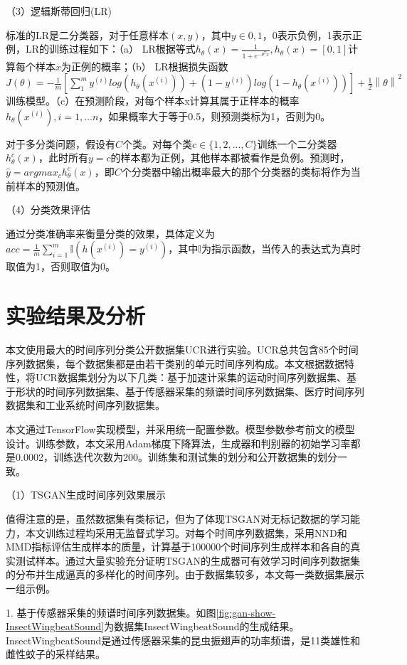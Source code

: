 （3）逻辑斯蒂回归(LR)

标准的LR是二分类器，对于任意样本$(x,y)$，其中$y \in {0,1}$，0表示负例，1表示正例，LR的训练过程如下：（a） LR根据等式$h_{\theta}(x) = \frac{1}{1+e^{-\theta^{T}x}}, h_{\theta}(x) = [0,1]$计算每个样本$x$为正例的概率；（b） LR根据损失函数$J(\theta) = -\frac{1}{m}[\sum_{1}^{m}y^{(i)}log(h_{\theta}(x^{(i)}))+(1-y^{(i)})log(1-h_{\theta}(x^{(i)}))] + \frac{1}{2}\left \| \theta \right \|^{2}$ 训练模型。（c）在预测阶段，对每个样本x计算其属于正样本的概率$h_{\theta}(x^{(i)}), i=1,...n$，如果概率大于等于0.5，则预测类标为1，否则为0。

对于多分类问题，假设有$C$个类。对每个类$c \in \{1,2,...,C\}$训练一个二分类器$ h_{\theta}^{c}(x)$，此时所有$y=c$的样本都为正例，其他样本都被看作是负例。预测时，$ \hat{y} = argmax_{c} h_{\theta}^{c}(x)$，即$C$个分类器中输出概率最大的那个分类器的类标将作为当前样本的预测值。

（4）分类效果评估

通过分类准确率来衡量分类的效果，具体定义为$acc = \frac{1}{m}\sum_{i=1}^{m}\mathbb{I}(h(x^{(i)}) = y^{(i)})$，其中$\mathbb{I}$为指示函数，当传入的表达式为真时取值为1，否则取值为0。


\section{实验结果及分析}

本文使用最大的时间序列分类公开数据集UCR\cite{bagnall16bakeoff}进行实验。UCR总共包含85个时间序列数据集，每个数据集都是由若干类别的单元时间序列构成。本文根据数据特性，将UCR数据集划分为以下几类：基于加速计采集的运动时间序列数据集、基于形状的时间序列数据集、基于传感器采集的频谱时间序列数据集、医疗时间序列数据集和工业系统时间序列数据集。

本文通过TensorFlow实现模型，并采用统一配置参数。模型参数参考前文的模型设计。训练参数，本文采用Adam梯度下降算法，生成器和判别器的初始学习率都是0.0002，训练迭代次数为200。训练集和测试集的划分和公开数据集的划分一致。

（1）TSGAN生成时间序列效果展示

值得注意的是，虽然数据集有类标记，但为了体现TSGAN对无标记数据的学习能力，本文训练过程均采用无监督式学习。对每个时间序列数据集，采用NND和MMD指标评估生成样本的质量，计算基于100000个时间序列生成样本和各自的真实测试样本。通过大量实验充分证明TSGAN的生成器可有效学习时间序列数据集的分布并生成逼真的多样化的时间序列。由于数据集较多，本文每一类数据集展示一组示例。

1. 基于传感器采集的频谱时间序列数据集。如图\ref{fig:gan-show-InsectWingbeatSound}为数据集InsectWingbeatSound的生成结果。InsectWingbeatSound是通过传感器采集的昆虫振翅声的功率频谱，是11类雄性和雌性蚊子的采样结果。

